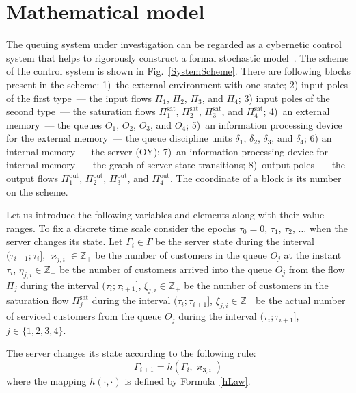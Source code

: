 \documentclass[runningheads,a4paper]{llncs}
\begin{document}
\section{Mathematical model}
The queuing system under investigation can be regarded as a cybernetic control system that helps to
rigorously construct a formal stochastic model~\cite{z:2012}. The scheme of the control system is
shown in Fig.~\ref{SystemScheme}. There are following blocks present in the scheme: 1)~the external
environment with one state; 2) input poles of the first type~--- the input flows $\Pi_1$, $\Pi_2$,
$\Pi_3$, and $\Pi_4$; 3) input poles of the second type~--- the saturation flows
$\Pi^{\mathrm{\text{sat}}}_1$, $\Pi^{\mathrm{\text{sat}}}_2$, $\Pi^{\mathrm{\text{sat}}}_3$, and
$\Pi^{\mathrm{\text{sat}}}_4$; 4)~an external memory~--- the queues $O_1$, $O_2$, $O_3$, and $O_4$;
5)~an information processing device for the external memory~--- the queue discipline units
$\delta_1$, $\delta_2$, $\delta_3$, and $\delta_4$; 6) an internal memory --- the server (OY); 7)~an
information processing device for internal memory~--- the graph of server state transitions;
8)~output poles~--- the output flows $\Pi^{\mathrm{\text{out}}}_1$, $\Pi^{\mathrm{\text{out}}}_2$,
$\Pi^{\mathrm{\text{out}}}_3$, and $\Pi^{\mathrm{\text{out}}}_4$.  The coordinate of a block is
its number on the scheme.

Let us  introduce the following variables and elements along with their
value ranges. To fix a discrete time scale consider the epochs $\tau_0=0$, $\tau_1$, $\tau_2$,
$\ldots$ when the server changes its state. Let $\Gamma_i\in\Gamma$ be the server state
during the interval $(\tau_{i-1};\tau_i]$, $\varkappa_{j,i} \in \mathbb{Z}_+ $ be the number of customers in
the queue $O_j$ at the instant $\tau_i$, $\eta_{j,i} \in \mathbb{Z}_+$ be the number of customers
arrived into the queue $O_j$ from the flow $\Pi_j$ during the interval $(\tau_{i};\tau_{i+1}]$, $\xi_{j,i} \in
\mathbb{Z}_+$ be the number of customers in the saturation flow $\Pi^{\mathrm{\text{sat}}}_j$ during
the interval $(\tau_{i};\tau_{i+1}]$, $\overline{\xi}_{j,i}\in \mathbb{Z}_+$ be the actual number of 
serviced customers from the queue  $O_j$ during the interval $(\tau_{i};\tau_{i+1}]$, $j\in
\{1,2,3,4\}$.

The server changes its state according to the following rule:
\begin{equation}
\Gamma_{i+1}=h(\Gamma_i,\varkappa_{3,i})
\label{gammaFunc}
\end{equation}
where the mapping $h(\cdot,\cdot)$ is defined by Formula~\eqref{hLaw}.
\end{document}
